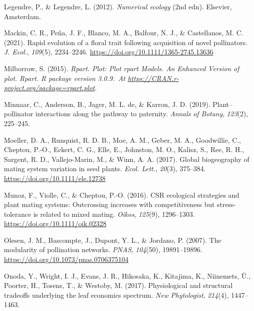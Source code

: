 \documentclass[
  12pt,
  a4paper,
]{article}
\newlength{\cslhangindent}
\newlength{\cslentryspacingunit} %
\newenvironment{CSLReferences}[2] %
 {%
  \setlength{\parindent}{0pt}
  \ifodd #1
  \let\oldpar\par
  \def\par{\hangindent=\cslhangindent\oldpar}
  \fi
  \setlength{\parskip}{#2\cslentryspacingunit}
 }%
 {}
\begin{document}
\begin{CSLReferences}{1}{0}
\leavevmode{}%
Legendre, P., \& Legendre, L. (2012). \emph{Numerical ecology} ({2nd edn}). {Elsevier, Amsterdam}.

\leavevmode{}%
Mackin, C. R., Peña, J. F., Blanco, M. A., Balfour, N. J., \& Castellanos, M. C. (2021). Rapid evolution of a floral trait following acquisition of novel pollinators. \emph{J. Ecol.}, \emph{109}(5), 2234--2246. \url{https://doi.org/10.1111/1365-2745.13636}

\leavevmode{}%
Milborrow, S. (2015). \emph{Rpart. Plot: {Plot} rpart {Models}. {An Enhanced Version} of plot. Rpart. R package version 3.0.9.~At \href{https://CRAN.R-project.org/package=rpart.plot}{https://CRAN.r-project.org/package=rpart.plot}}.

\leavevmode{}%
Minnaar, C., Anderson, B., Jager, M. L. de, \& Karron, J. D. (2019). Plant--pollinator interactions along the pathway to paternity. \emph{Annals of Botany}, \emph{123}(2), 225--245.

\leavevmode{}%
Moeller, D. A., Runquist, R. D. B., Moe, A. M., Geber, M. A., Goodwillie, C., Cheptou, P.-O., Eckert, C. G., Elle, E., Johnston, M. O., Kalisz, S., Ree, R. H., Sargent, R. D., Vallejo-Marin, M., \& Winn, A. A. (2017). Global biogeography of mating system variation in seed plants. \emph{Ecol. Lett.}, \emph{20}(3), 375--384. \url{https://doi.org/10.1111/ele.12738}

\leavevmode{}%
Munoz, F., Violle, C., \& Cheptou, P.-O. (2016). {CSR} ecological strategies and plant mating systems: Outcrossing increases with competitiveness but stress-tolerance is related to mixed mating. \emph{Oikos}, \emph{125}(9), 1296--1303. \url{https://doi.org/10.1111/oik.02328}

\leavevmode{}%
Olesen, J. M., Bascompte, J., Dupont, Y. L., \& Jordano, P. (2007). The modularity of pollination networks. \emph{PNAS}, \emph{104}(50), 19891--19896. \url{https://doi.org/10.1073/pnas.0706375104}

\leavevmode{}%
Onoda, Y., Wright, I. J., Evans, J. R., Hikosaka, K., Kitajima, K., Niinemets, Ü., Poorter, H., Tosens, T., \& Westoby, M. (2017). Physiological and structural tradeoffs underlying the leaf economics spectrum. \emph{New Phytologist}, \emph{214}(4), 1447--1463.


\end{CSLReferences}
\end{document}
